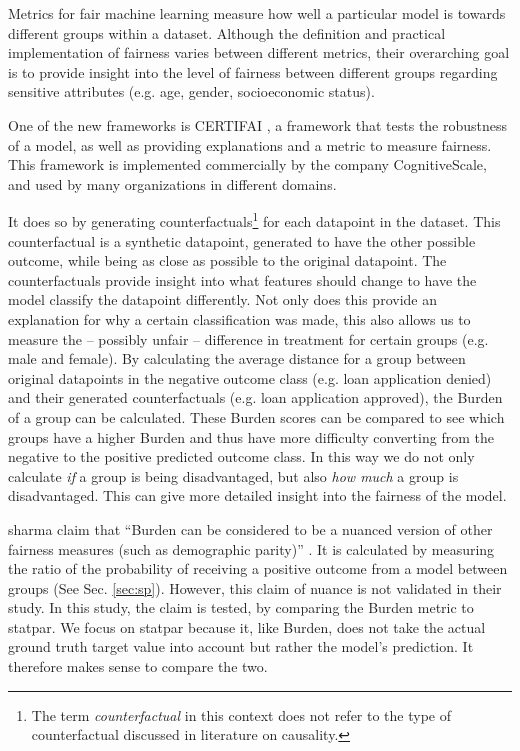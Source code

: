\documentclass[runningheads]{llncs}
\begin{document}
Metrics for fair machine learning measure how well a particular model is towards different groups within a dataset. Although the definition and practical implementation of fairness varies between different metrics, their overarching goal is to provide insight into the level of fairness between different groups regarding sensitive attributes (e.g. age, gender, socioeconomic status).

One of the new frameworks is CERTIFAI \cite{certifai}, a framework that tests the robustness of a model, as well as providing explanations and a metric to measure fairness. This framework is implemented commercially by the company CognitiveScale, and used by many organizations in different domains.

It does so by generating counterfactuals\footnote{The term \textit{counterfactual} in this context does not refer to the  type of counterfactual discussed in literature on causality.} for each datapoint in the dataset. This counterfactual is a synthetic datapoint, generated to have the other possible outcome, while being as close as possible to the original datapoint\cite{wachter2017counterfactual}. The counterfactuals provide insight into what features should change to have the model classify the datapoint differently. Not only does this provide an explanation for why a certain classification was made, this also allows us to measure the -- possibly unfair -- difference in treatment for certain groups (e.g. male and female). By calculating the average distance for a group between original datapoints in the negative outcome class (e.g. loan application denied) and their generated counterfactuals (e.g. loan application approved), the \gls{Burden} of a group can be calculated. These \gls{Burden} scores can be compared to see which groups have a higher \gls{Burden} and thus have more difficulty converting from the negative to the positive predicted outcome class. In this way we do not only calculate \textit{if} a group is being disadvantaged, but also \textit{how much} a group is disadvantaged. This can give more detailed insight into the fairness of the model.

\gls{sharma} claim that ``Burden can be considered to be a nuanced version of other fairness measures (such as demographic parity)'' \cite[p.~170]{certifai}.
It is calculated by measuring the ratio of the probability of receiving a positive outcome from a model between groups (See Sec. \ref{sec:sp}). However, this claim of nuance is not validated in their study. In this study, the claim is tested, by comparing the \gls{Burden} metric to \gls{statpar}. We focus on \gls{statpar} because it, like \gls{Burden}, does not take the actual ground truth target value into account but rather the model's prediction. It therefore makes sense to compare the two. 
\end{document}
